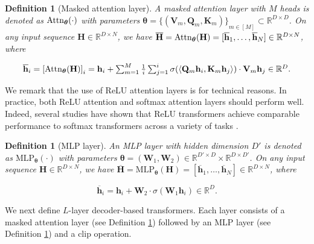 \documentclass[10pt]{article}
\newtheorem{definition}[theorem]{Definition}
\renewcommand{\bar}{\overline}
\newcommand{\<}{\left\langle}
\renewcommand{\>}{\right\rangle}
\renewcommand{\bQ}{\mathbf{Q}}
\newcommand{\Attn}{{\rm Attn}}
\newcommand{\barsig}{\sigma}
\newcommand{\MLP}{\mathrm{MLP}}
\newcommand{\paren}[1]{{\left( #1 \right)}}
\newcommand{\brac}[1]{{\left[ #1 \right]}}
\newcommand{\sets}[1]{{\{ #1 \}}}
\newcommand{\R}{\mathbb{R}}
\def\bH{{\mathbf H}}
\def\bK{{\mathbf K}}
\def\bQ{{\mathbf Q}}
\def\bV{{\mathbf V}}
\def\bW{{\mathbf W}}
\def\btheta{{\boldsymbol \theta}}
\def\bh{{\mathbf h}}
\begin{document}
\begin{definition}[Masked attention layer]
\label{def:masked-attention}
A masked attention layer with $M$ heads is denoted as $\Attn_{\btheta}(\cdot)$ with parameters $\btheta=\sets{ (\bV_m,\bQ_m,\bK_m)}_{m\in[M]}\subset \R^{D\times D}$. On any input sequence $\bH\in\R^{D\times N}$, we have $\bar{\bH} = \Attn_{\btheta}(\bH) = [\bar{\bh}_1, \ldots, \bar{\bh}_N] \in \R^{D \times N}$, where















\begin{align*}
\textstyle    \bar{\bh}_i = \brac{\Attn_{\btheta}(\bH)}_i = \bh_i + \sum_{m=1}^M \frac{1}{i}\sum_{j=1}^i \barsig\paren{ \<\bQ_m\bh_i, \bK_m\bh_j\> }\cdot \bV_m\bh_j \in \R^D.
\end{align*}
\end{definition}

We remark that the use of ReLU attention layers is for technical reasons. In practice, both ReLU attention and softmax attention layers should perform well. Indeed, several studies have shown that ReLU transformers achieve comparable performance to softmax transformers  across a variety of tasks \citep{wortsman2023replacing, shen2023study, bai2023transformers}.

\begin{definition}[MLP layer]
\label{def:mlp}
An MLP layer with hidden dimension $D'$ is denoted as $\MLP_{\btheta}(\cdot)$ with parameters $\btheta=(\bW_1,\bW_2)\in\R^{D'\times D}\times\R^{D\times D'}$. On any input sequence $\bH\in\R^{D\times N}$, we have $\bar{\bH} = \MLP_{\btheta}(\bH) = [\bar{\bh}_1, \ldots, \bar{\bh}_N] \in \R^{D \times N}$, where





\[
\bar{\bh}_i=\bh_i+\bW_2 \cdot \sigma(\bW_1\bh_i) \in \R^D.
\]
\end{definition}
We next define $L$-layer decoder-based transformers. Each layer consists of a masked attention layer (see Definition \ref{def:masked-attention}) followed by an MLP layer (see Definition \ref{def:mlp}) and a clip operation. 
\end{document}
